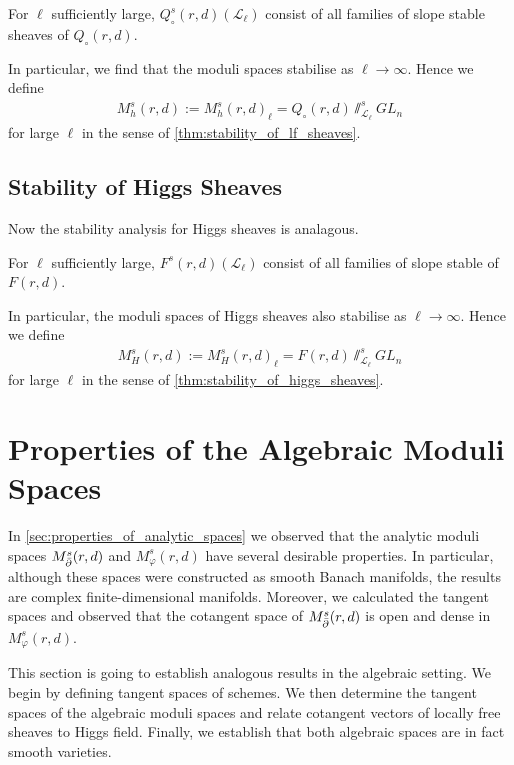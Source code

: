 \documentclass[12pt]{ociamthesis}  %
\begin{document}
\begin{corollary}\label{thm:stability_of_lf_sheaves}
  For $\ell$ sufficiently large, $Q^s_\circ(r,d)(\mathscr L_\ell)$
  consist of all families of  slope stable sheaves of $Q_\circ(r,d)$.
\end{corollary}

In particular, we find that the moduli spaces stabilise as $\ell \to \infty$.
Hence we define
\begin{align}\label{eq:plain_algebraic_space}
  M^s_h(r,d) := M^s_h(r,d)_\ell = Q_\circ(r,d)\sslash^s_{\mathscr L_\ell} GL_n
\end{align}
for large $\ell$ in the sense of \ref{thm:stability_of_lf_sheaves}.

\subsection{Stability of Higgs Sheaves}

Now the stability analysis for Higgs sheaves is analagous.
\missingsection

\begin{corollary}\label{thm:stability_of_higgs_sheaves}
  For $\ell$ sufficiently large, $F^s(r,d)(\mathscr L_\ell)$
  consist of all families of slope stable of $F(r,d)$.
\end{corollary}

In particular, the moduli spaces of Higgs sheaves also stabilise as
$\ell\to\infty$. Hence we define
\begin{align}\label{eq:higgs_algebraic_space}
  M^s_H(r,d) := M^s_H(r,d)_\ell = F(r,d)\sslash^s_{\mathscr L_\ell} GL_n
\end{align}
for large $\ell$ in the sense of \ref{thm:stability_of_higgs_sheaves}.

\section{Properties of the Algebraic Moduli Spaces}

In \ref{sec:properties_of_analytic_spaces} we observed that the
analytic moduli spaces $M^s_{\bar{\partial}}(r,d)$ and $M^s_\varphi(r,d)$ have
several desirable properties. In particular, although
these spaces were constructed as smooth Banach manifolds, the results
are complex finite-dimensional manifolds. Moreover, we calculated
the tangent spaces and observed that the cotangent space of
$M^s_{\bar{\partial}}(r,d)$ is open and dense in $M^s_\varphi(r,d)$.

This section is going to establish analogous results in the algebraic
setting. We begin by defining tangent spaces of schemes. We then
determine the tangent spaces of the algebraic moduli spaces and
relate cotangent vectors of locally free sheaves to Higgs field. Finally,
we establish that both algebraic spaces are in fact smooth varieties.
\end{document}
